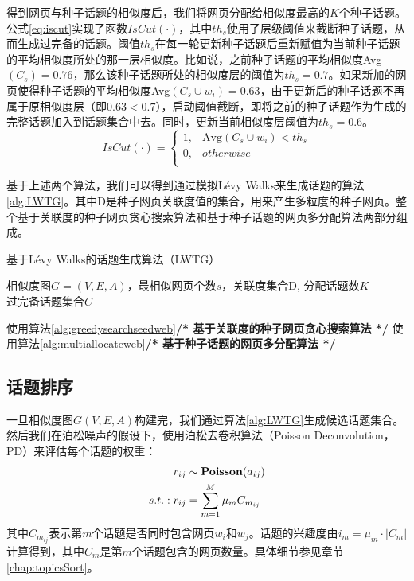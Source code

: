 得到网页与种子话题的相似度后，我们将网页分配给相似度最高的$K$个种子话题。公式\ref{eq:iscut}实现了函数$IsCut(\cdot)$，其中$th_s$使用了层级阈值来截断种子话题，从而生成过完备的话题。阈值$th_s$在每一轮更新种子话题后重新赋值为当前种子话题的平均相似度所处的那一层相似度。比如说，之前种子话题的平均相似度Avg$(C_s)=0.76$，那么该种子话题所处的相似度层的阈值为$th_s=0.7$。如果新加的网页使得种子话题的平均相似度Avg$(C_s\cup w_i)=0.63$，由于更新后的种子话题不再属于原相似度层（即$0.63<0.7$），启动阈值截断，即将之前的种子话题作为生成的完整话题加入到话题集合中去。同时，更新当前相似度层阈值为$th_s=0.6$。
\begin{equation} \label{eq:iscut}
IsCut(\cdot) =
\begin{cases}
1, & \text{Avg}(C_s\cup w_i) < th_s\\
0, & otherwise\\
\end{cases}
\end{equation}

基于上述两个算法，我们可以得到通过模拟L\'evy Walks来生成话题的算法\ref{alg:LWTG}。其中D是种子网页关联度值的集合，用来产生多粒度的种子网页。整个基于关联度的种子网页贪心搜索算法和基于种子话题的网页多分配算法两部分组成。
\begin{algorithm}[!htbp]
    \caption{基于L\'evy Walks的话题生成算法（LWTG）}\label{alg:LWTG}
    \hspace*{0.02in}{\bf Input:}
    相似度图$G=(V,E,A)$，最相似网页个数$s$，关联度集合D, 分配话题数$K$\\
    \hspace*{0.02in}{\bf Output:}
    过完备话题集合$C$
    \begin{algorithmic}
            \State 使用算法\ref{alg:greedysearchseedweb}\qquad \qquad \textbf{/* 基于关联度的种子网页贪心搜索算法 */}
            \State 使用算法\ref{alg:multiallocateweb}\qquad \qquad \textbf{/* 基于种子话题的网页多分配算法 */}
        \EndFor
    \end{algorithmic}
\end{algorithm}


\subsection{话题排序}

一旦相似度图$G(V,E,A)$构建完，我们通过算法\ref{alg:LWTG}生成候选话题集合。然后我们在泊松噪声的假设下，使用泊松去卷积算法（Poisson Deconvolution，PD）来评估每个话题的权重：
\begin{align} \label{eq:poisondeconvolution}
r_{ij} &\sim \textbf{Poisson}(a_{ij})\notag\\
s.t.: r_{ij} &= \sum_{m=1}^{M}\mu_mC_{m_{ij}}
\end{align}
其中$C_{m_{ij}}$表示第$m$个话题是否同时包含网页$w_i$和$w_j$。话题的兴趣度由$i_m=\mu_m\cdot|C_m|$计算得到，其中$C_m$是第$m$个话题包含的网页数量。具体细节参见章节\ref{chap:topicsSort}。




